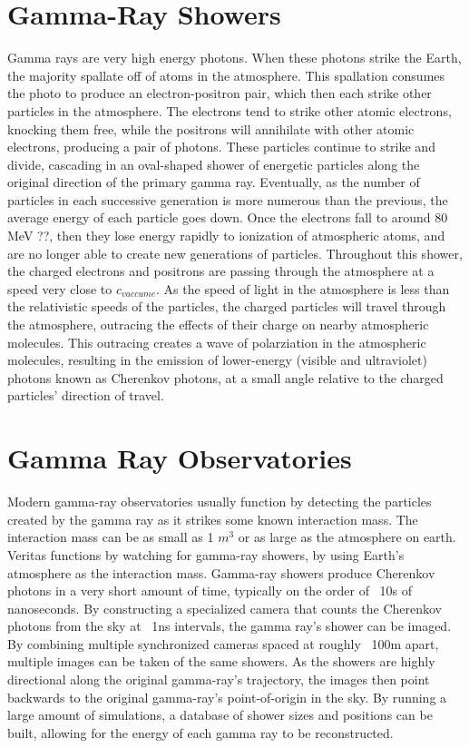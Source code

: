 \section{Gamma-Ray Showers}
Gamma rays are very high energy photons.
When these photons strike the Earth, the majority spallate off of atoms in the atmosphere.
This spallation consumes the photo to produce an electron-positron pair, which then each strike other particles in the atmosphere.
The electrons tend to strike other atomic electrons, knocking them free, while the positrons will annihilate with other atomic electrons, producing a pair of photons.
These particles continue to strike and divide, cascading in an oval-shaped shower of energetic particles along the original direction of the primary gamma ray.
Eventually, as the number of particles in each successive generation is more numerous than the previous, the average energy of each particle goes down.
Once the electrons fall to around 80 MeV ??, then they lose energy rapidly to ionization of atmospheric atoms, and are no longer able to create new generations of particles.
Throughout this shower, the charged electrons and positrons are passing through the atmosphere at a speed very close to $c_{vaccume}$.
As the speed of light in the atmosphere is less than the relativistic speeds of the particles, the charged particles will travel through the atmosphere, outracing the effects of their charge on nearby atmospheric molecules.
This outracing creates a wave of polarziation in the atmospheric molecules, resulting in the emission of lower-energy (visible and ultraviolet) photons known as Cherenkov photons, at a small angle relative to the charged particles' direction of travel.

\section{Gamma Ray Observatories}
Modern gamma-ray observatories usually function by detecting the particles created by the gamma ray as it strikes some known interaction mass.
The interaction mass can be as small as 1 $m^3$ or as large as the atmosphere on earth.
Veritas functions by watching for gamma-ray showers, by using Earth's atmosphere as the interaction mass.
Gamma-ray showers produce Cherenkov photons in a very short amount of time, typically on the order of ~10s of nanoseconds.
By constructing a specialized camera that counts the Cherenkov photons from the sky at ~1ns intervals, the gamma ray's shower can be imaged.
By combining multiple synchronized cameras spaced at roughly ~100m apart, multiple images can be taken of the same showers.
As the showers are highly directional along the original gamma-ray's trajectory, the images then point backwards to the original gamma-ray's point-of-origin in the sky.
By running a large amount of simulations, a database of shower sizes and positions can be built, allowing for the energy of each gamma ray to be reconstructed.

